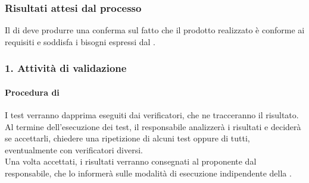 \subsubsection{Risultati attesi dal processo}
Il  di  deve produrre una conferma sul fatto che il prodotto realizzato è conforme ai requisiti e soddisfa i bisogni espressi dal .

\subsubsection{1. Attività di validazione}
\paragraph*{Procedura di }
I test verranno dapprima eseguiti dai verificatori, che ne tracceranno il risultato. Al termine dell'esecuzione dei test, il responsabile analizzerà i risultati e deciderà se accettarli, chiedere una ripetizione di alcuni test oppure di tutti, eventualmente con verificatori diversi. \\
Una volta accettati, i risultati verranno consegnati al proponente dal responsabile, che lo informerà sulle modalità di esecuzione indipendente della .
